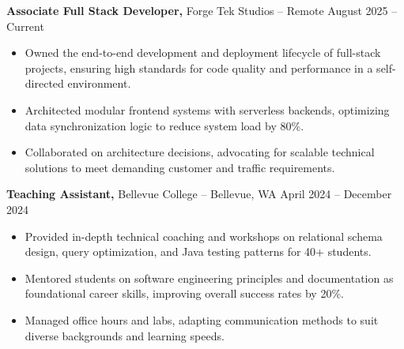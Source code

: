 \documentclass[11pt]{article}       %
\begin{document}
\textbf{Associate Full Stack Developer,} {Forge Tek Studios} -- Remote \hfill August 2025 -- Current 
\vspace{-9pt}
\begin{itemize}
  \item Owned the end-to-end development and deployment lifecycle of full-stack projects, ensuring high standards for code quality and performance in a self-directed environment.
  \item Architected modular frontend systems with serverless backends, optimizing data synchronization logic to reduce system load by 80\%.
  \item Collaborated on architecture decisions, advocating for scalable technical solutions to meet demanding customer and traffic requirements.
\end{itemize}

\textbf{Teaching Assistant,} {Bellevue College} -- Bellevue, WA \hfill April 2024 -- December 2024 \\
\vspace{-9pt}
\begin{itemize}
  \item Provided in-depth technical coaching and workshops on relational schema design, query optimization, and Java testing patterns for 40+ students.
  \item Mentored students on software engineering principles and documentation as foundational career skills, improving overall success rates by 20\%.
  \item Managed office hours and labs, adapting communication methods to suit diverse backgrounds and learning speeds.
\end{itemize}

\end{document}
